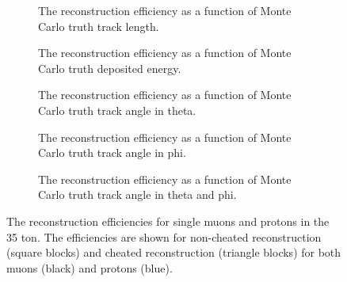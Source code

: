 \begin{figure}[h!]
  \centering
  \begin{subfigure}{.45\textwidth}
        \centering
        \caption{The reconstruction efficiency as a function of Monte Carlo truth track length.}
        \label{fig:Isol_Effic_Len}
  \end{subfigure}
  \hspace{0.08\textwidth}
  \begin{subfigure}{.45\textwidth}
        \centering
        \caption{The reconstruction efficiency as a function of Monte Carlo truth deposited energy.}
        \label{fig:Isol_Effic_EnDepos}
  \end{subfigure}
  \begin{subfigure}{.45\textwidth}
        \centering
        \caption{The reconstruction efficiency as a function of Monte Carlo truth track angle in theta.}
        \label{fig:Isol_Effic_Theta}
  \end{subfigure}
  \hspace{0.08\textwidth}
  \begin{subfigure}{.45\textwidth}
        \centering
        \caption{The reconstruction efficiency as a function of Monte Carlo truth track angle in phi.}
        \label{fig:Isol_Effic_Phi}
  \end{subfigure}
  \begin{subfigure}{.45\textwidth}
        \centering
        \caption{The reconstruction efficiency as a function of Monte Carlo truth track angle in theta and phi.}
        \label{fig:Isol_Effic_PhiTheta}
  \end{subfigure}
  \caption[The reconstruction efficiencies for single muons and protons in the 35 ton.]
          {The reconstruction efficiencies for single muons and protons in the 35 ton. The efficiencies are shown for non-cheated reconstruction (square blocks) and cheated reconstruction (triangle blocks) for both muons (black) and protons (blue).}
  \label{fig:Isol_Effic}
\end{figure}

